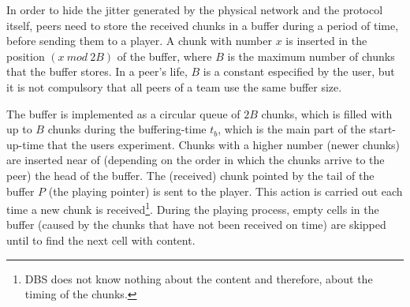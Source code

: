 

\label{sec:buffering_chunks}

In order to hide the jitter generated by the physical network and the
protocol itself, peers need to store the received chunks in a buffer
during a period of time, before sending them to a player. A chunk with
number $x$ is inserted in the position $(x~\mathit{mod}~2B)$ of the
buffer, where $B$ is the maximum number of chunks that the buffer
stores. In a peer's life, $B$ is a constant especified by the user,
but it is not compulsory that all peers of a team use the same buffer
size.

The buffer is implemented as a circular queue of $2B$ chunks, which is
filled with up to $B$ chunks during the \gls{buffering-time} $t_b$,
which is the main part of the \gls{start-up-time} that the users
experiment. Chunks with a higher number (newer chunks) are inserted
near of (depending on the order in which the chunks arrive to the
peer) the head of the buffer. The (received) chunk pointed by the tail
of the buffer $P$ (the playing pointer) is sent to the player. This
action is carried out each time a new chunk is received\footnote{DBS
  does not know nothing about the content and therefore, about the
  timing of the chunks.}. During the playing process, empty cells in
the buffer (caused by the chunks that have not been received on time)
are skipped until to find the next cell with content.

